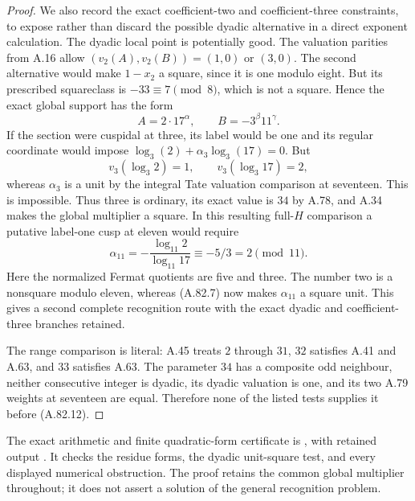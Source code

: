 \begin{proof}
We also record the exact coefficient-two and
coefficient-three constraints, to expose rather than
discard the possible dyadic alternative in a direct
exponent calculation.
The dyadic local point is potentially good.
The valuation parities from A.16 allow
$(v_2(A),v_2(B))=(1,0)$ or $(3,0)$.
The second alternative would make $1-x_2$ a square,
since it is one modulo eight.  But its prescribed
squareclass is $-33\equiv7\pmod8$, which is not a
square.  Hence the exact global support has the form
\[
                  A=2\cdot17^\alpha,
               \qquad B=-3^\beta11^\gamma.
\tag{A.82.13}
\]
If the section were cuspidal at three, its label would
be one and its regular coordinate would impose
$\log_3(2)+\alpha_3\log_3(17)=0$.
But
\[
              v_3(\log_3 2)=1,
                       \qquad v_3(\log_3 17)=2,
\tag{A.82.14}
\]
whereas $\alpha_3$ is a unit by the integral Tate
valuation comparison at seventeen.  This is impossible.
Thus three is ordinary, its exact value is $34$ by
A.78, and A.34 makes the global multiplier a square.
In this resulting full-$H$ comparison a putative
label-one cusp at eleven would require
\[
              \alpha_{11}
                   =-\frac{\log_{11}2}{\log_{11}17}
                         \equiv-5/3=2\pmod{11}.
\tag{A.82.15}
\]
Here the normalized Fermat quotients are five and
three.  The number two is a nonsquare modulo eleven,
whereas (A.82.7) now makes $\alpha_{11}$ a square unit.
This gives a second complete recognition route with
the exact dyadic and coefficient-three branches retained.

The range comparison is literal: A.45 treats $2$ through
$31$, $32$ satisfies A.41 and A.63, and $33$ satisfies
A.63.  The parameter $34$ has a composite odd neighbour,
neither consecutive integer is dyadic, its dyadic
valuation is one, and its two A.79 weights at seventeen
are equal.  Therefore none of the listed tests supplies
it before (A.82.12).
\end{proof}

\noindent The exact arithmetic and finite quadratic-form
certificate is ,
with retained output
.
It checks the residue forms, the dyadic unit-square test,
and every displayed numerical obstruction.  The proof
retains the common global multiplier throughout; it
does not assert a solution of the general recognition
problem.
